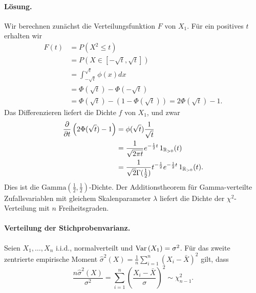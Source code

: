 \paragraph*{Lösung. }
Wir berechnen zunächst die Verteilungsfunktion $F$ von $X_1$. Für ein positives $t$
erhalten wir
\begin{align*}
    F(t) &= P \left( X^2 \leq t \right) \\
    &= P \left( X \in \left[ -\sqrt{t}, \sqrt{t} \right]  \right) \\
    &= \int_{-\sqrt{t}}^{\sqrt{t}} \phi(x) dx \\
    &= \Phi(\sqrt{t}) - \Phi(-\sqrt{t}) \\
    &= \Phi(\sqrt{t}) - (1 - \Phi(\sqrt{t})) = 2 \Phi(\sqrt{t}) -1. 
\end{align*}
Das Differenzieren liefert die Dichte $f$ von $X_1$, und zwar
\begin{align*}
    \frac{\partial}{\partial t} \left( 2 \Phi(\sqrt{t}) - 1 \right) 
    &= \phi(\sqrt{t}) \frac{1}{\sqrt{t}} \\
    &= \frac{1}{\sqrt{2\pi t}} e^{-\frac{1}{2}t} \, 1_{\mathbb R_{>0}}(t) \\
    &= \frac{1}{\sqrt{2}\Gamma(\frac{1}{2})} t^{-\frac{1}{2}} e^{-\frac{1}{2}t} \, 1_{\mathbb R_{>0}}(t).
\end{align*}
Dies ist die $\text{Gamma}(\frac{1}{2}, \frac{1}{2})$-Dichte. Der
Additionstheorem für Gamma-verteilte Zufallsvariablen mit gleichem
Skalenparameter $\lambda$ liefert die Dichte der $\chi^{2}$-Verteilung mit $n$
Freiheitsgraden. 



\paragraph{Verteilung der Stichprobenvarianz. }
Seien $X_1, \ldots, X_n$ i.i.d., normalverteilt und $\operatorname{Var}\left( X_1 \right)=\sigma^2$.
Für das zweite zentrierte empirische  Moment 
$\hat \sigma^2 \left( X \right)= \frac{1}{n} \sum_{i=1}^{n} \left( X_i - \bar X \right)^2 $
gilt, dass
\begin{equation*}
    \frac{n \hat \sigma^2 \left( X \right)}{\sigma^2 } = 
        \sum_{i=1}^{n} \left( \frac{X_i - \bar X}{ \sigma} \right)^2 \sim \chi^2_{n-1}.
\end{equation*}


